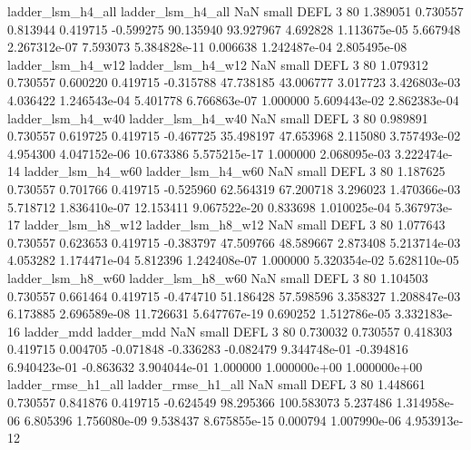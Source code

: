        ladder_lsm_h4_all        ladder_lsm_h4_all                   NaN      small     DEFL                 3 80 1.389051       0.730557 0.813944       0.419715   -0.599275     90.135940     93.927967     4.692828   1.113675e-05  5.667948 2.267312e-07     7.593073   5.384828e-11            0.006638    1.242487e-04        2.805495e-08
       ladder_lsm_h4_w12        ladder_lsm_h4_w12                   NaN      small     DEFL                 3 80 1.079312       0.730557 0.600220       0.419715   -0.315788     47.738185     43.006777     3.017723   3.426803e-03  4.036422 1.246543e-04     5.401778   6.766863e-07            1.000000    5.609443e-02        2.862383e-04
       ladder_lsm_h4_w40        ladder_lsm_h4_w40                   NaN      small     DEFL                 3 80 0.989891       0.730557 0.619725       0.419715   -0.467725     35.498197     47.653968     2.115080   3.757493e-02  4.954300 4.047152e-06    10.673386   5.575215e-17            1.000000    2.068095e-03        3.222474e-14
       ladder_lsm_h4_w60        ladder_lsm_h4_w60                   NaN      small     DEFL                 3 80 1.187625       0.730557 0.701766       0.419715   -0.525960     62.564319     67.200718     3.296023   1.470366e-03  5.718712 1.836410e-07    12.153411   9.067522e-20            0.833698    1.010025e-04        5.367973e-17
       ladder_lsm_h8_w12        ladder_lsm_h8_w12                   NaN      small     DEFL                 3 80 1.077643       0.730557 0.623653       0.419715   -0.383797     47.509766     48.589667     2.873408   5.213714e-03  4.053282 1.174471e-04     5.812396   1.242408e-07            1.000000    5.320354e-02        5.628110e-05
       ladder_lsm_h8_w60        ladder_lsm_h8_w60                   NaN      small     DEFL                 3 80 1.104503       0.730557 0.661464       0.419715   -0.474710     51.186428     57.598596     3.358327   1.208847e-03  6.173885 2.696589e-08    11.726631   5.647767e-19            0.690252    1.512786e-05        3.332183e-16
              ladder_mdd               ladder_mdd                   NaN      small     DEFL                 3 80 0.730032       0.730557 0.418303       0.419715    0.004705     -0.071848     -0.336283    -0.082479   9.344748e-01 -0.394816 6.940423e-01    -0.863632   3.904044e-01            1.000000    1.000000e+00        1.000000e+00
      ladder_rmse_h1_all       ladder_rmse_h1_all                   NaN      small     DEFL                 3 80 1.448661       0.730557 0.841876       0.419715   -0.624549     98.295366    100.583073     5.237486   1.314958e-06  6.805396 1.756080e-09     9.538437   8.675855e-15            0.000794    1.007990e-06        4.953913e-12
